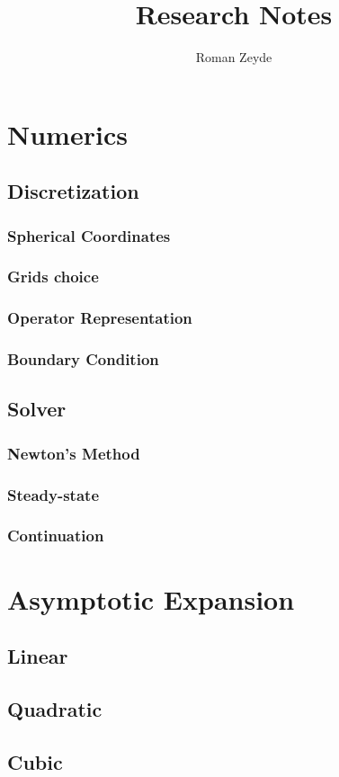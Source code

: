 \documentclass[11pt]{article}
\title{Research Notes}
\author{Roman Zeyde}
\begin{document}


\section{Numerics}
\subsection{Discretization}
\subsubsection{Spherical Coordinates}
\subsubsection{Grids choice}
\subsubsection{Operator Representation}
\subsubsection{Boundary Condition}
\subsection{Solver}
\subsubsection{Newton's Method}
\subsubsection{Steady-state}
\subsubsection{Continuation}


\section{Asymptotic Expansion}
\subsection{Linear}
\subsection{Quadratic}
\subsection{Cubic}
\end{document}
